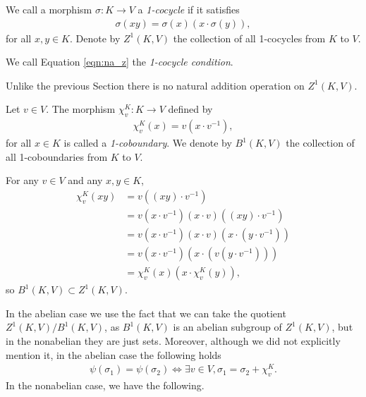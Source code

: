 \begin{definition} We call a morphism $\sigma:K\rightarrow V$ a \emph{1-cocycle} if it satisfies
\begin{align}
  \sigma(xy) = \sigma(x) (x\cdot\sigma(y)),
  \label{eqn:na_z}
\end{align}
for all $x, y \in K$. Denote by $Z^1\left( K, V \right)$ the collection of all 1-cocycles from $K$ to $V$.

We call Equation \ref{eqn:na_z} the \emph{1-cocycle condition}.
\end{definition}

\begin{remark} Unlike the previous Section there is no natural addition operation on $Z^1(K, V)$.
\end{remark}

\begin{definition} Let $v \in V$. The morphism $\chi^K_v:K\rightarrow V$ defined by
\begin{align*}
	\chi^K_v (x) = v (x\cdot v^{-1}),
\end{align*}
for all $x \in K$ is called a \emph{1-coboundary}. We denote by $B^1\left(K, V\right)$ the collection of all 1-coboundaries from $K$ to $V$.
\end{definition}

For any $v \in V$ and any $x, y \in K$,
\begin{align*}
	\chi^K_v(xy) &=  v \left((xy) \cdot v^{-1}\right) \\
	&=  v (x \cdot v^{-1}) (x \cdot v) ((xy) \cdot v^{-1}) \\
	&=  v \left(x \cdot v^{-1}\right) (x \cdot v) \left(x \cdot \left(y \cdot v^{-1}\right)\right) \\
	&=  v \left(x \cdot v^{-1}\right) \left(x \cdot \left( v \left(y \cdot v^{-1}\right)\right)\right) \\
	&=  \chi^K_v(x) (x \cdot \chi^K_v(y)),
\end{align*}
so $B^1(K, V) \subset Z^1(K, V)$.

In the abelian case we use the fact that we can take the quotient $Z^1(K, V)/B^1(K, V)$, as $B^1(K, V)$ is an abelian subgroup of $Z^1(K, V)$, but in the nonabelian they are just sets. Moreover, although we did not explicitly mention it, in the abelian case the following holds
\begin{align*}
	\psi(\sigma_1) = \psi(\sigma_2) \Leftrightarrow \exists v \in V, \sigma_1 = \sigma_2 + \chi^K_v.
\end{align*}
In the nonabelian case, we have the following.

